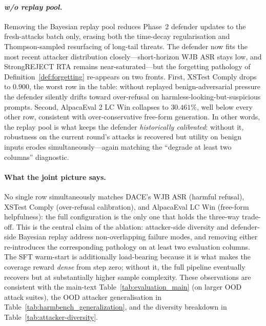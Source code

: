 \documentclass{article}
\newcommand{\method}{\textsc{DACE}\xspace}
\begin{document}
\paragraph{\textit{w/o replay pool.}}
Removing the Bayesian replay pool reduces Phase~2 defender updates to the fresh-attacks batch only, erasing both the time-decay regularisation and Thompson-sampled resurfacing of long-tail threats. The defender now fits the most recent attacker distribution closely---short-horizon WJB ASR stays low, and StrongREJECT RTA remains near-saturated---but the forgetting pathology of Definition~\ref{def:forgetting} re-appears on two fronts. First, XSTest Comply drops to $0.900$, the worst row in the table: without replayed benign-adversarial pressure the defender silently drifts toward over-refusal on harmless-looking-but-suspicious prompts. Second, AlpacaEval 2 LC Win collapses to $30.461\%$, well below every other row, consistent with over-conservative free-form generation. In other words, the replay pool is what keeps the defender \emph{historically calibrated}: without it, robustness on the current round's attacks is recovered but utility on benign inputs erodes simultaneously---again matching the ``degrade at least two columns'' diagnostic.

\paragraph{What the joint picture says.}
No single row simultaneously matches \method's WJB ASR (harmful refusal), XSTest Comply (over-refusal calibration), and AlpacaEval LC Win (free-form helpfulness): the full configuration is the only one that holds the three-way trade-off. This is the central claim of the ablation: attacker-side diversity and defender-side Bayesian replay address non-overlapping failure modes, and removing either re-introduces the corresponding pathology on at least two evaluation columns. The SFT warm-start is additionally load-bearing because it is what makes the coverage reward \emph{dense} from step zero; without it, the full pipeline eventually recovers but at substantially higher sample complexity. These observations are consistent with the main-text Table~\ref{tab:evaluation_main} (on larger OOD attack suites), the OOD attacker generalisation in Table~\ref{tab:harmbench_generalization}, and the diversity breakdown in Table~\ref{tab:attacker-diversity}.





\end{document}
